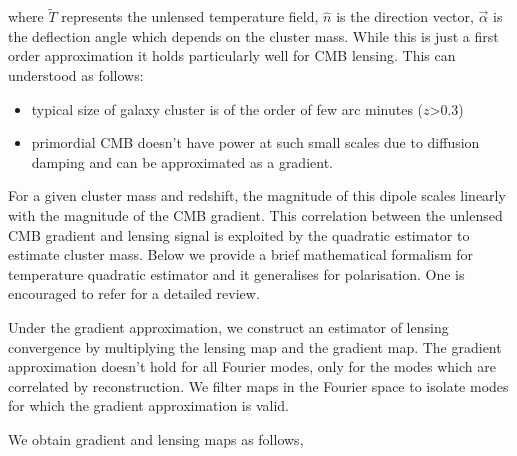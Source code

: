 where $ \tilde{T}$ represents the unlensed temperature field, $\hat{n}$ is the direction vector, $\vec{\alpha}$ is the deflection angle which depends on the cluster mass.
While this is just a first order approximation it holds particularly well for CMB lensing. 
This can understood as follows:
\begin{itemize}
\item typical size of galaxy cluster is of the order of few arc minutes ($z$>0.3)
\item primordial CMB doesn't have power at such small scales due to diffusion damping \cite{silk68} and can be approximated as a gradient. 
\end{itemize}
For a given cluster mass and redshift, the magnitude of this dipole scales linearly with the magnitude of the CMB gradient.
This correlation between the unlensed CMB gradient and lensing signal is exploited by the quadratic estimator to estimate cluster mass.
Below we provide a brief mathematical formalism for temperature quadratic estimator and it generalises for polarisation. One is encouraged to refer \cite{hu07} for a detailed review.

 Under the gradient approximation, we construct an estimator of lensing convergence by multiplying the lensing map and the gradient map.
The gradient approximation doesn't hold for all Fourier modes, only for the modes which are correlated by reconstruction.
We filter maps in the Fourier space to isolate modes for which the gradient approximation is valid.
 
 We obtain gradient and lensing maps as follows,
 
